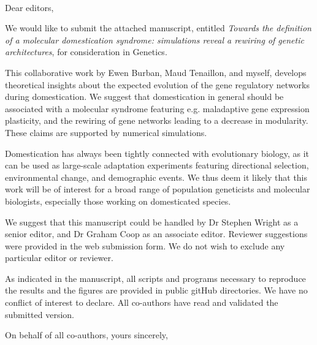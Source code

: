 \documentclass[12pt]{lettre}
\begin{document}

\begin{letter}{~}

\nodate
\nolieu

\def\concname{Subject:~}

\opening{Dear editors, }


We would like to submit the attached manuscript, entitled \emph{Towards the definition of a molecular domestication syndrome: simulations reveal a rewiring of genetic architectures}, for consideration in Genetics. 

This collaborative work by Ewen Burban, Maud Tenaillon, and myself, develops theoretical insights about the expected evolution of the gene regulatory networks during domestication. We suggest that domestication in general should be associated with a molecular syndrome featuring e.g. maladaptive gene expression plasticity, and the rewiring of gene networks leading to a decrease in modularity. These claims are supported by numerical simulations. 

Domestication has always been tightly connected with evolutionary biology, as it can be used as large-scale adaptation experiments featuring directional selection, environmental change, and demographic events.  We thus deem it likely that this work will be of interest for a broad range of population geneticists and molecular biologists, especially those working on domesticated species. 

We suggest that this manuscript could be handled by Dr Stephen Wright as a senior editor, and Dr Graham Coop as an associate editor. Reviewer suggestions were provided in the web submission form. We do not wish to exclude any particular editor or reviewer. 

As indicated in the manuscript, all scripts and programs necessary to reproduce the results and the figures are provided in public gitHub directories. We have no conflict of interest to declare. All co-authors have read and validated the submitted version. 

\closing{On behalf of all co-authors, yours sincerely,}

\end{letter}
\end{document}
